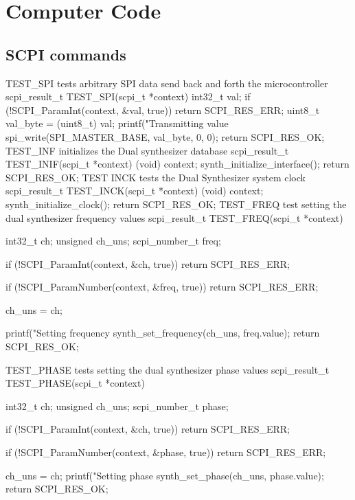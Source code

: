 \chapter{Computer Code}
\section{SCPI commands}
TEST_SPI
tests arbitrary SPI data send back and forth the microcontroller
scpi_result_t TEST_SPI(scpi_t *context)
{
    int32_t val;
    if (!SCPI_ParamInt(context, &val, true)) {
        return SCPI_RES_ERR;
    }
    uint8_t val_byte = (uint8_t) val;
    printf("Transmitting value %
    spi_write(SPI_MASTER_BASE, val_byte, 0, 0);
    return SCPI_RES_OK;   
}
TEST_INF
initializes the Dual synthesizer database
scpi_result_t TEST_INIF(scpi_t *context)
{
    (void) context;
    synth_initialize_interface();
    return SCPI_RES_OK;   
}
TEST INCK
tests the Dual Synthesizer system clock
scpi_result_t TEST_INCK(scpi_t *context)
{
    (void) context;
    synth_initialize_clock();
    return SCPI_RES_OK;   
}
TEST_FREQ
test setting the dual synthesizer frequency values 
scpi_result_t TEST_FREQ(scpi_t *context)
{
    int32_t ch;
    unsigned ch_uns;
    scpi_number_t freq;

    if (!SCPI_ParamInt(context, &ch, true)) {
        return SCPI_RES_ERR;
    }

    if (!SCPI_ParamNumber(context, &freq, true)) {
        return SCPI_RES_ERR;
    }

    ch_uns = ch;

    printf("Setting frequency %
    synth_set_frequency(ch_uns, freq.value);
    return SCPI_RES_OK;
}

TEST_PHASE
tests setting the dual synthesizer phase values
scpi_result_t TEST_PHASE(scpi_t *context)
{
  int32_t ch;
  unsigned ch_uns;
  scpi_number_t phase;


    if (!SCPI_ParamInt(context, &ch, true)) {
        return SCPI_RES_ERR;
    }

    if (!SCPI_ParamNumber(context, &phase, true)) {
        return SCPI_RES_ERR;
    }

    ch_uns = ch;
    printf("Setting phase %
    synth_set_phase(ch_uns, phase.value);
    return SCPI_RES_OK;

}

